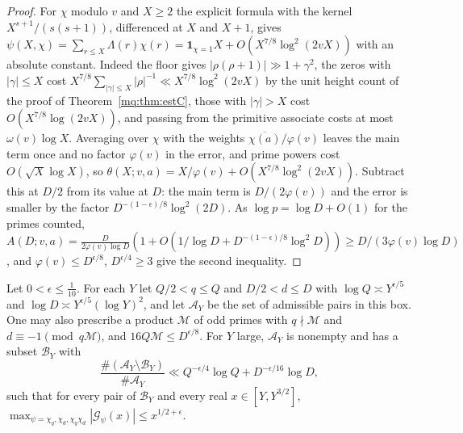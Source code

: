 \begin{proof}
For $\chi$ modulo $v$ and $X\ge2$ the explicit formula with the kernel $X^{s+1}/(s(s+1))$, differenced at $X$ and $X+1$, gives $\psi(X,\chi)=\sum_{r\le X}\Lambda(r)\chi(r)=\mathbf 1_{\chi=1}X+O(X^{7/8}\log^2(2vX))$ with an absolute constant. Indeed the floor gives $|\rho(\rho+1)|\gg1+\gamma^2$, the zeros with $|\gamma|\le X$ cost $X^{7/8}\sum_{|\gamma|\le X}|\rho|^{-1}\ll X^{7/8}\log^2(2vX)$ by the unit height count of the proof of Theorem~\ref{mq:thm:estC}, those with $|\gamma|>X$ cost $O(X^{7/8}\log(2vX))$, and passing from the primitive associate costs at most $\omega(v)\log X$. Averaging over $\chi$ with the weights $\overline{\chi(a)}/\varphi(v)$ leaves the main term once and no factor $\varphi(v)$ in the error, and prime powers cost $O(\sqrt X\log X)$, so $\theta(X;v,a)=X/\varphi(v)+O(X^{7/8}\log^2(2vX))$. Subtract this at $D/2$ from its value at $D$: the main term is $D/(2\varphi(v))$ and the error is smaller by the factor $D^{-(1-\epsilon)/8}\log^2(2D)$. As $\log p=\log D+O(1)$ for the primes counted, $A(D;v,a)=\frac D{2\varphi(v)\log D}(1+O(1/\log D+D^{-(1-\epsilon)/8}\log^2D))\ge D/(3\varphi(v)\log D)$, and $\varphi(v)\le D^{\epsilon/8}$, $D^{\epsilon/4}\ge3$ give the second inequality.
\end{proof}

\begin{theorem}\label{mq:thm:estB}
Let $0<\epsilon\le\frac1{10}$. For each $Y$ let $Q/2<q\le Q$ and $D/2<d\le D$ with $\log Q\asymp Y^{\epsilon/5}$ and $\log D\asymp Y^{\epsilon/5}(\log Y)^2$, and let $\mathcal A_Y$ be the set of admissible pairs in this box. One may also prescribe a product $\mathcal M$ of odd primes with $q\nmid\mathcal M$ and $d\equiv-1\pmod{q\mathcal M}$, and $16Q\mathcal M\le D^{\epsilon/8}$. For $Y$ large, $\mathcal A_Y$ is nonempty and has a subset $\mathcal B_Y$ with
\[
\frac{\#(\mathcal A_Y\setminus\mathcal B_Y)}{\#\mathcal A_Y}\ll Q^{-\epsilon/4}\log Q+D^{-\epsilon/16}\log D,
\]
such that for every pair of $\mathcal B_Y$ and every real $x\in[Y,Y^{3/2}]$, $\max_{\psi=\chi_q,\chi_d,\chi_q\chi_d}|\mathcal G_\psi(x)|\le x^{1/2+\epsilon}$.
\end{theorem}

